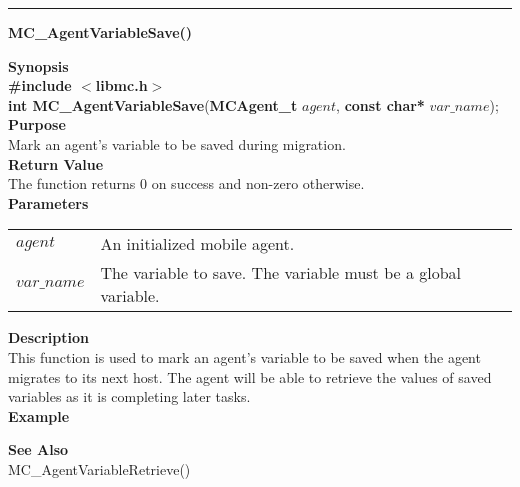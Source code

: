 \noindent
\vspace{5pt}
\rule{6.5in}{0.015in}
\noindent
{}
{\LARGE \bf MC\_AgentVariableSave()}\\
\label{api:MC_AgentVariableSave()}

\noindent
{\bf Synopsis}\\
{\bf \#include $<$libmc.h$>$}\\
{\bf int MC\_AgentVariableSave}({\bf MCAgent\_t} $agent$, {\bf const char*} $var\_name$);\\

\noindent
{\bf Purpose}\\
Mark an agent's variable to be saved during migration.\\

\noindent
{\bf Return Value}\\
The function returns 0 on success and non-zero otherwise.\\

\noindent
{\bf Parameters}
\vspace{-0.1in}
\begin{description}
\item
\begin{tabular}{p{10 mm}p{145 mm}} 
$agent$ & An initialized mobile agent.\\
$var\_name$ & The variable to save. The variable must be a global variable.
\end{tabular}
\end{description}

\noindent
{\bf Description}\\
This function is used to mark an agent's variable to be saved when the agent
migrates to its next host. The agent will be able to retrieve the values of
saved variables as it is completing later tasks.\\

\noindent
{\bf Example}\\
\noindent
{\footnotesize}

\noindent
{\bf See Also}\\
MC\_AgentVariableRetrieve()

